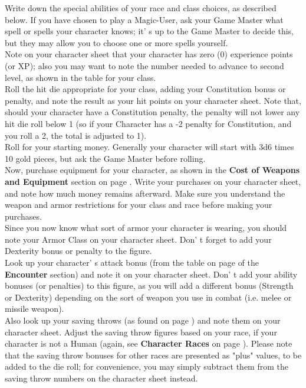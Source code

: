 \documentclass[a4paper,twoside,openany,10pt]{book}
\begin{document}
\begin{multicols}{2}
Write down the special abilities of your race and class choices, as described below. If you have chosen to play a Magic-User, ask your Game Master what spell or spells your character knows; it' s up to the Game Master to decide this, but they may allow you to choose one or more spells yourself.\\

Note on your character sheet that your character has zero (0) experience points (or XP); also you may want to note the number needed to advance to second level, as shown in the table for your class.\\

Roll the hit die appropriate for your class, adding your Constitution bonus or penalty, and note the result as your hit points on your character sheet. Note that, should your character have a Constitution penalty, the penalty will not lower any hit die roll below 1 (so if your Character has a -2 penalty for Constitution, and you roll a 2, the total is adjusted to 1).\\

Roll for your starting money. Generally your character will start with 3d6 times 10 gold pieces, but ask the Game Master before rolling.\\

Now, purchase equipment for your character, as shown in the \textbf{Cost of Weapons and Equipment} section on page  \hyperlink{cost-of-weapons-and-equipment}{\pageref{cost-of-weapons-and-equipment}}. Write your purchases on your character sheet, and note how much money remains afterward. Make sure you understand the weapon and armor restrictions for your class and race before making your purchases.\\

Since you now know what sort of armor your character is wearing, you should note your Armor Class on your character sheet. Don' t forget to add your Dexterity bonus or penalty to the figure.\\

Look up your character' s attack bonus (from the table on page \hyperlink{evasion-and-pursuit}{\pageref{evasion-and-pursuit}} of the \textbf{Encounter} section) and note it on your character sheet. Don' t add your ability bonuses (or penalties) to this figure, as you will add a different bonus (Strength or Dexterity) depending on the sort of weapon you use in combat (i.e. melee or missile weapon).\\

Also look up your saving throws (as found on page \hyperlink{saving-throw-tables-by-class}{\pageref{saving-throw-tables-by-class}}) and note them on your character sheet. Adjust the saving throw figures based on your race, if your character is not a Human (again, see \textbf{Character Races} on page \hyperlink{character-races}{\pageref{character-races}}). Please note that the saving throw bonuses for other races are presented as "plus" values, to be added to the die roll; for convenience, you may simply subtract them from the saving throw numbers on the character sheet instead. \\


\end{multicols}
\end{document}
